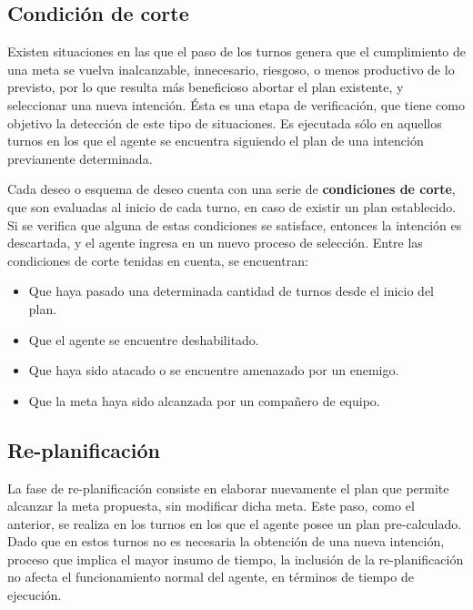 \documentclass[oneside]{book}
\theoremstyle{definition}
\theoremstyle{example}
\begin{document}
\subsection{Condición de corte}

\label{sec:condicionDeCorte}

Existen situaciones en las que el paso de los turnos genera que el cumplimiento de una 
meta se vuelva inalcanzable, innecesario, riesgoso, o menos productivo de lo previsto, por 
lo que resulta más beneficioso abortar el plan existente, y seleccionar una nueva intención. 
Ésta es una etapa de verificación, que tiene como objetivo la detección de este tipo de 
situaciones. Es ejecutada sólo en aquellos turnos en los que el agente se encuentra 
siguiendo el plan de una intención previamente determinada.

Cada deseo o esquema de deseo cuenta con una serie de \textbf{condiciones de corte}, que 
son evaluadas al inicio de cada turno, en caso de existir un plan establecido. Si se verifica 
que alguna de estas condiciones se satisface, entonces la intención es descartada, y el 
agente ingresa en un nuevo proceso de selección. 
Entre las condiciones de corte tenidas en cuenta, se encuentran: 

\begin{itemize}
	\item Que haya pasado una determinada cantidad de turnos desde el inicio del plan.
	\item Que el agente se encuentre deshabilitado.
	\item Que haya sido atacado o se encuentre amenazado por un enemigo.
	\item Que la meta haya sido alcanzada por un compañero de equipo.
\end{itemize}

\subsection{Re-planificación}

La fase de re-planificación consiste en elaborar nuevamente el plan que permite alcanzar 
la meta propuesta, sin modificar dicha meta. Este paso, como el anterior, se realiza en 
los turnos en los que el agente posee un plan pre-calculado. Dado que en estos turnos no 
es necesaria la obtención de una nueva intención, proceso que implica el mayor insumo de 
tiempo, la inclusión de la re-planificación no afecta el funcionamiento normal del agente, 
en términos de tiempo de ejecución. 
\end{document}
